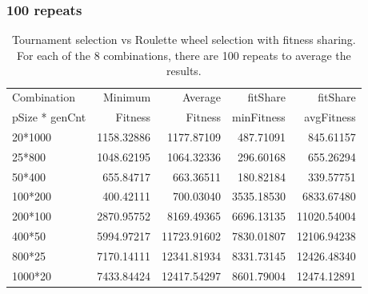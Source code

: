 \documentclass[10pt,b5paper]{article}
\begin{document}
\subsubsection{100 repeats}
\label{sec-3-2-1}

\begin{table}[htb]
\caption{Tournament selection vs Roulette wheel selection with fitness sharing. For each of the 8 combinations, there are 100 repeats to average the results.}
\centering
\begin{tabular}{lrrrr}
\hline
Combination & Minimum & Average & fitShare & fitShare\\
pSize * genCnt & Fitness & Fitness & minFitness & avgFitness\\
\hline
20*1000 & 1158.32886 & 1177.87109 & 487.71091 & 845.61157\\
25*800 & 1048.62195 & 1064.32336 & 296.60168 & 655.26294\\
50*400 & 655.84717 & 663.36511 & 180.82184 & 339.57751\\
100*200 & 400.42111 & 700.03040 & 3535.18530 & 6833.67480\\
200*100 & 2870.95752 & 8169.49365 & 6696.13135 & 11020.54004\\
400*50 & 5994.97217 & 11723.91602 & 7830.01807 & 12106.94238\\
800*25 & 7170.14111 & 12341.81934 & 8331.73145 & 12426.48340\\
1000*20 & 7433.84424 & 12417.54297 & 8601.79004 & 12474.12891\\
\hline
\end{tabular}
\end{table}
\end{document}

